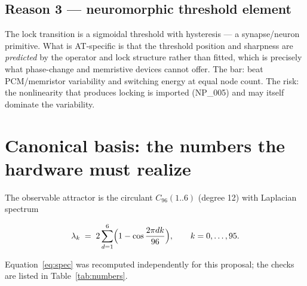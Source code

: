 \documentclass[11pt,a4paper]{article}
\newcommand{\ls}[1]{\ensuremath{\lambda_{#1}}}
\newcommand{\Cninety}{\ensuremath{C_{96}(1..6)}}
\begin{document}
\subsection{Reason 3 --- neuromorphic threshold element}
The lock transition is a sigmoidal threshold with hysteresis --- a synapse/neuron primitive. What is
AT-specific is that the threshold position and sharpness are \emph{predicted} by the operator and
lock structure rather than fitted, which is precisely what phase-change and memristive devices
cannot offer. The bar: beat PCM/memristor variability and switching energy at equal node count. The
risk: the nonlinearity that produces locking is imported (NP\_005) and may itself dominate the
variability.

\section{Canonical basis: the numbers the hardware must realize}

The observable attractor is the circulant \Cninety{} (degree 12) with Laplacian spectrum

\begin{equation}
\ls{k} \;=\; 2\sum_{d=1}^{6}\Bigl(1-\cos\frac{2\pi dk}{96}\Bigr),
\qquad k=0,\dots,95 .
\label{eq:spec}
\end{equation}

Equation~\eqref{eq:spec} was recomputed independently for this proposal; the checks are listed in
Table~\ref{tab:numbers}.
\end{document}
